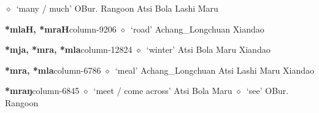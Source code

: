 \hspace{1ex}
         $\diamond$~`many / much'
         OBur. 
\hspace{1ex}
         Rangoon 
\hspace{1ex}
         Atsi 
\hspace{1ex}
         Bola 
\hspace{1ex}
         Lashi 
\hspace{1ex}
         Maru 
  \item {\footnotesize \textbf{*mlaH, *mraH}}{\tiny column-9206}
         $\diamond$~`road'
         Achang\_Longchuan 
\hspace{1ex}
         Xiandao 
  \item {\footnotesize \textbf{*mja, *mra, *mla}}{\tiny column-12824}
         $\diamond$~`winter'
         Atsi 
\hspace{1ex}
         Bola 
\hspace{1ex}
         Maru 
\hspace{1ex}
         Xiandao 
  \item {\footnotesize \textbf{*mra, *mla}}{\tiny column-6786}
         $\diamond$~`meal'
         Achang\_Longchuan 
\hspace{1ex}
         Atsi 
\hspace{1ex}
         Lashi 
\hspace{1ex}
         Maru 
\hspace{1ex}
         Xiandao 
  \item {\footnotesize \textbf{*mraŋ}}{\tiny column-6845}
         $\diamond$~`meet / come across'
         Atsi 
\hspace{1ex}
         Bola 
\hspace{1ex}
         Maru 
\hspace{1ex}
         $\diamond$~`see'
         OBur. 
\hspace{1ex}
         Rangoon 

